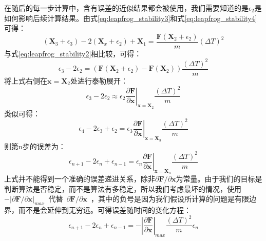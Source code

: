 {在随后的每一步计算中，含有误差的近似结果都会被使用，我们需要知道的是${\epsilon}_2$是如何影响后续计算结果。由式\ref{eq:leapfrog_stability3}和式\ref{eq:leapfrog_stability4}可得：
      \begin{equation}
         \label{eq:leapfrog_stabilit6}
         (\mathbf{X}_{3}+{\epsilon}_3)-2(\mathbf{X}_{x}+{\epsilon}_2)+\mathbf{X}_{1} = \frac{\mathbf{F}(\mathbf{X}_2+{\epsilon}_2)}{m} {(\Delta T)^2}
      \end{equation}
与式\ref{eq:leapfrog_stability2}相比较，可得：
      \begin{equation}
         \label{eq:leapfrog_stabilit7}
         {\epsilon}_3-2{\epsilon}_2 = \left(\mathbf{F}(\mathbf{X}_2+{\epsilon}_2)  -\mathbf{F}(\mathbf{X}_2) \right)\frac{{(\Delta T)^2}}{m}
      \end{equation}
将上式右侧在$\mathbf{x}=\mathbf{X}_2$处进行泰勒展开：
      \begin{equation}
         \label{eq:leapfrog_stabilit8}
         {\epsilon}_3-2{\epsilon}_2 \approx {\epsilon}_2\left. \frac{\partial\mathbf{F}}{\partial\mathbf{x}}\right|_{\mathbf{x}=\mathbf{X}_2} \frac{{(\Delta T)^2}}{m}
      \end{equation}
类似可得：
      \begin{equation}
         \label{eq:leapfrog_stabilit9}
         {\epsilon}_4-2{\epsilon}_3+{\epsilon}_2 = {\epsilon}_3\left. \frac{\partial\mathbf{F}}{\partial\mathbf{x}}\right|_{\mathbf{x}=\mathbf{X}_3} \frac{{(\Delta T)^2}}{m}
      \end{equation}
则第n步的误差为：
      \begin{equation}
         \label{eq:leapfrog_stabilit10}
         {\epsilon}_{n+1}-2{\epsilon}_n+{\epsilon}_{n-1} = {\epsilon}_n \left. \frac{\partial\mathbf{F}}{\partial\mathbf{x}}\right|_{\mathbf{x}=\mathbf{X}_n} \frac{{(\Delta T)^2}}{m}
      \end{equation}
上式并不能得到一个准确的误差递进关系，除非${\partial\mathbf{F}}/{\partial\mathbf{x}}$为常量。由于我们的目标是判断算法是否稳定，而不是算法有多稳定，所以我们考虑最坏的情况，使用~$-|{\partial\mathbf{F}}/{\partial\mathbf{x}}|_{max}$~代替~${\partial\mathbf{F}}/{\partial\mathbf{x}}$~，其中的负号是因为我们假设所计算的问题是有限边界，而不是会延伸到无穷远。可得误差随时间的变化方程：
      \begin{equation}
        \label{eq:leapfrog_stabilit11}
         {\epsilon}_{n+1}-2{\epsilon}_n+{\epsilon}_{n-1} = -\left| \frac{\partial\mathbf{F}}{\partial\mathbf{x}}\right|_{max} \frac{{(\Delta T)^2}}{m} {\epsilon}_n
      \end{equation}
}
